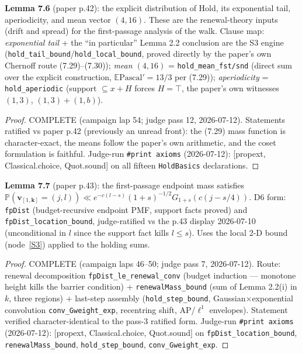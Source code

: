\begin{lemma}\label{X5}
  \leanok
\textbf{Lemma 7.6} (paper p.42): the explicit distribution of \(\mathrm{Hold}\), its
exponential tail, aperiodicity, and mean vector \((4,16)\).  These are the renewal-theory
inputs (drift and spread) for the first-passage analysis of the walk.  Clause map:
\emph{exponential tail} + the ``in particular'' Lemma 2.2 conclusion are the S3 engine
(\texttt{hold\_tail\_bound}/\texttt{hold\_local\_bound}, proved directly by the paper's own
Chernoff route (7.29)--(7.30)); \emph{mean \((4,16)\)} = \texttt{hold\_mean\_fst/snd}
(direct sum over the explicit construction, \(\mathbb{E}\mathrm{Pascal}' = 13/3\) per
(7.29)); \emph{aperiodicity} = \texttt{hold\_aperiodic} (support \(\subseteq x + H\)
forces \(H = \top\), the paper's own witnesses \((1,3)\), \((1,3)+(1,b)\)).
\end{lemma}
\begin{proof}
  \leanok
COMPLETE (campaign lap 54; judge pass 12, 2026-07-12).  Statements ratified vs paper p.42
(previously an unread front): the (7.29) mass function is character-exact, the means follow
the paper's own arithmetic, and the coset formulation is faithful.  Judge-run
\texttt{\#print axioms} (2026-07-12): [propext, Classical.choice, Quot.sound] on all
fifteen \texttt{HoldBasics} declarations.
\end{proof}

\begin{lemma}\label{X6}
  \leanok
\textbf{Lemma 7.7} (paper p.43): the first-passage endpoint mass satisfies
\(\mathbb{P}(\mathbf{v}_{[1,\mathbf{k}]}=(j,l)) \ll e^{-c(l-s)}(1+s)^{-1/2}
G_{1+s}(c(j-s/4))\).  D6 form: \texttt{fpDist} (budget-recursive endpoint PMF, support
facts proved) and \texttt{fpDist\_location\_bound}, judge-ratified vs the p.43 display
2026-07-10 (unconditional in \(l\) since the support fact kills \(l\le s\)).
Uses the local 2-D bound (node~\ref{S3}) applied to the holding sums.
\end{lemma}
\begin{proof}
  \leanok
COMPLETE (campaign laps 46--50; judge pass 7, 2026-07-12).  Route: renewal decomposition
\texttt{fpDist\_le\_renewal\_conv} (budget induction --- monotone height kills the barrier
condition) + \texttt{renewalMass\_bound} (sum of Lemma 2.2(i) in \(k\), three regions) +
last-step assembly (\texttt{hold\_step\_bound}, Gaussian\(\times\)exponential convolution
\texttt{conv\_Gweight\_exp}, recentring shift, AP/\(\ell^1\) envelopes).  Statement verified
character-identical to the pass-3 ratified form.  Judge-run \texttt{\#print axioms}
(2026-07-12): [propext, Classical.choice, Quot.sound] on
\texttt{fpDist\_location\_bound}, \texttt{renewalMass\_bound}, \texttt{hold\_step\_bound},
\texttt{conv\_Gweight\_exp}.
\end{proof}

